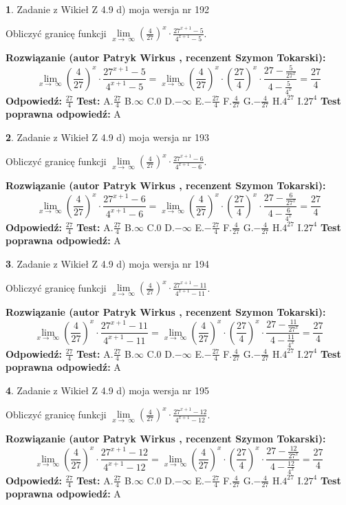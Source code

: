 \documentclass[12pt, a4paper]{article}
\theoremstyle{definition} %
\newtheorem{zad}{}
\newcommand{\zadStart}[1]{\begin{zad}#1\newline}
\newcommand{\zadStop}{\end{zad}}
\newcommand{\rozwStart}[2]{\noindent \textbf{Rozwiązanie (autor #1 , recenzent #2): }\newline}
\newcommand{\rozwStop}{\newline}
\newcommand{\odpStart}{\noindent \textbf{Odpowiedź:}\newline}
\newcommand{\odpStop}{\newline}
\newcommand{\testStart}{\noindent \textbf{Test:}\newline}
\newcommand{\testStop}{\newline}
\newcommand{\kluczStart}{\noindent \textbf{Test poprawna odpowiedź:}\newline}
\newcommand{\kluczStop}{\newline}
\begin{document}
\zadStart{Zadanie z Wikieł Z 4.9 d) moja wersja nr 192}


Obliczyć granicę funkcji  $\lim\limits_{x\to\ \infty}(\frac{4}{27})^{x}\cdot\frac{27^{x+1}-5}{4^{x+1}-5}$.
\zadStop
\rozwStart{Patryk Wirkus}{Szymon Tokarski}
$$\lim\limits_{x\to\ \infty}(\frac{4}{27})^{x}\cdot\frac{27^{x+1}-5}{4^{x+1}-5}=\lim\limits_{x\to\ \infty}(\frac{4}{27})^{x}\cdot(\frac{27}{4})^{x} \cdot \frac{27-\frac{5}{27^{x}}}{4-\frac{5}{4^{x}}} = \frac{27}{4}$$
\rozwStop
\odpStart
$\frac{27}{4}$
\odpStop
\testStart
A.$\frac{27}{4}$ B.$\infty$ C.$0$ D.$-\infty$ E.$-\frac{27}{4}$
F.$\frac{4}{27}$ G.$-\frac{4}{27}$
H.$4^{27}$
I.$27^{4}$
\testStop
\kluczStart
A
\kluczStop



\zadStart{Zadanie z Wikieł Z 4.9 d) moja wersja nr 193}


Obliczyć granicę funkcji  $\lim\limits_{x\to\ \infty}(\frac{4}{27})^{x}\cdot\frac{27^{x+1}-6}{4^{x+1}-6}$.
\zadStop
\rozwStart{Patryk Wirkus}{Szymon Tokarski}
$$\lim\limits_{x\to\ \infty}(\frac{4}{27})^{x}\cdot\frac{27^{x+1}-6}{4^{x+1}-6}=\lim\limits_{x\to\ \infty}(\frac{4}{27})^{x}\cdot(\frac{27}{4})^{x} \cdot \frac{27-\frac{6}{27^{x}}}{4-\frac{6}{4^{x}}} = \frac{27}{4}$$
\rozwStop
\odpStart
$\frac{27}{4}$
\odpStop
\testStart
A.$\frac{27}{4}$ B.$\infty$ C.$0$ D.$-\infty$ E.$-\frac{27}{4}$
F.$\frac{4}{27}$ G.$-\frac{4}{27}$
H.$4^{27}$
I.$27^{4}$
\testStop
\kluczStart
A
\kluczStop



\zadStart{Zadanie z Wikieł Z 4.9 d) moja wersja nr 194}


Obliczyć granicę funkcji  $\lim\limits_{x\to\ \infty}(\frac{4}{27})^{x}\cdot\frac{27^{x+1}-11}{4^{x+1}-11}$.
\zadStop
\rozwStart{Patryk Wirkus}{Szymon Tokarski}
$$\lim\limits_{x\to\ \infty}(\frac{4}{27})^{x}\cdot\frac{27^{x+1}-11}{4^{x+1}-11}=\lim\limits_{x\to\ \infty}(\frac{4}{27})^{x}\cdot(\frac{27}{4})^{x} \cdot \frac{27-\frac{11}{27^{x}}}{4-\frac{11}{4^{x}}} = \frac{27}{4}$$
\rozwStop
\odpStart
$\frac{27}{4}$
\odpStop
\testStart
A.$\frac{27}{4}$ B.$\infty$ C.$0$ D.$-\infty$ E.$-\frac{27}{4}$
F.$\frac{4}{27}$ G.$-\frac{4}{27}$
H.$4^{27}$
I.$27^{4}$
\testStop
\kluczStart
A
\kluczStop



\zadStart{Zadanie z Wikieł Z 4.9 d) moja wersja nr 195}


Obliczyć granicę funkcji  $\lim\limits_{x\to\ \infty}(\frac{4}{27})^{x}\cdot\frac{27^{x+1}-12}{4^{x+1}-12}$.
\zadStop
\rozwStart{Patryk Wirkus}{Szymon Tokarski}
$$\lim\limits_{x\to\ \infty}(\frac{4}{27})^{x}\cdot\frac{27^{x+1}-12}{4^{x+1}-12}=\lim\limits_{x\to\ \infty}(\frac{4}{27})^{x}\cdot(\frac{27}{4})^{x} \cdot \frac{27-\frac{12}{27^{x}}}{4-\frac{12}{4^{x}}} = \frac{27}{4}$$
\rozwStop
\odpStart
$\frac{27}{4}$
\odpStop
\testStart
A.$\frac{27}{4}$ B.$\infty$ C.$0$ D.$-\infty$ E.$-\frac{27}{4}$
F.$\frac{4}{27}$ G.$-\frac{4}{27}$
H.$4^{27}$
I.$27^{4}$
\testStop
\kluczStart
A
\kluczStop
\end{document}
